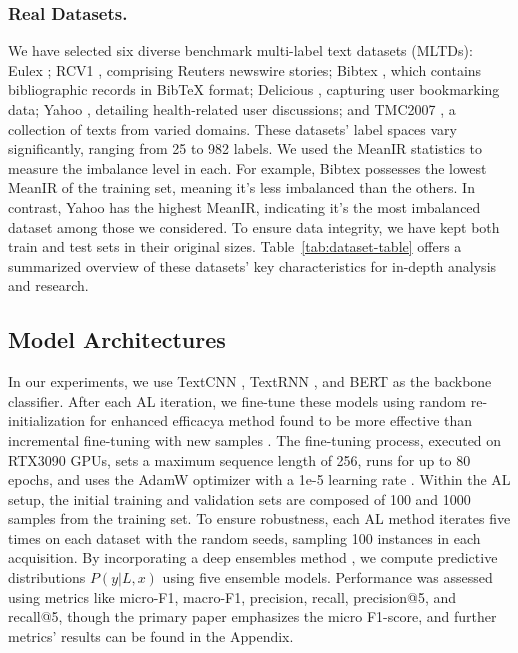 \documentclass[letterpaper]{article} %
\begin{document}
\subsubsection{Real Datasets.}



We have selected six diverse benchmark multi-label text datasets (MLTDs): Eulex \cite{LozaMenca2010}; RCV1 \cite{10.5555/1005332.1005345}, comprising Reuters newswire stories; Bibtex \cite{Katakis2008MultilabelTC}, which contains bibliographic records in BibTeX format; Delicious \cite{Tsoumakas2008EffectiveAE}, capturing user bookmarking data; Yahoo \cite{10.5555/2968618.2968710}, detailing health-related user discussions; and TMC2007 \cite{1559692}, a collection of texts from varied domains.
These datasets' label spaces vary significantly, ranging from 25 to 982 labels. We used the MeanIR statistics to measure the imbalance level in each. 
For example, Bibtex possesses the lowest MeanIR of the training set, meaning it's less imbalanced than the others. In contrast, Yahoo has the highest MeanIR, indicating it's the most imbalanced dataset among those we considered.
To ensure data integrity, we have kept both train and test sets in their original sizes. Table~\ref{tab:dataset-table} offers a summarized overview of these datasets' key characteristics for in-depth analysis and research.






\subsection{Model Architectures}

In our experiments, we use TextCNN \cite{kim-2014-convolutional}, TextRNN \cite{8632592}, and BERT \cite{devlin-etal-2019-bert} as the backbone classifier.
After each AL iteration, we fine-tune these models using random re-initialization \cite{frankle2018lottery} for enhanced efficacya method found to be more effective than incremental fine-tuning with new samples \cite{gal2017deep}. The fine-tuning process, executed on RTX3090 GPUs, sets a maximum sequence length of 256, runs for up to 80 epochs, and uses the AdamW optimizer with a 1e-5 learning rate \cite{nguyen-etal-2022-hardness,Nguyen_Tan_Du_Buntine_Beare_Chen_2023,nguyen2023lowresource}. Within the AL setup, the initial training and validation sets are composed of 100 and 1000 samples from the training set. To ensure robustness, each AL method iterates five times on each dataset with the random seeds, sampling 100 instances in each acquisition. By incorporating a deep ensembles method \cite{10.5555/3295222.3295387}, we compute predictive distributions $P(y| L, x)$ using five ensemble models. Performance was assessed using metrics like micro-F1, macro-F1, precision, recall, precision@5, and recall@5, though the primary paper emphasizes the micro F1-score, and further metrics' results can be found in the Appendix.
\end{document}
